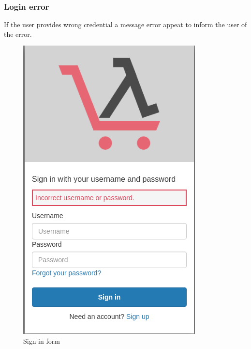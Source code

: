 \subsubsection{Login error}
If the user provides wrong credential a message error appeat to inform the user of the error.
\begin{figure}[!ht]
    \caption{Sign-in form}
    \vspace{10px}
    \includegraphics[scale=0.3]{../../../../Images/userManual/singInError.png}
    \centering
\end{figure}
